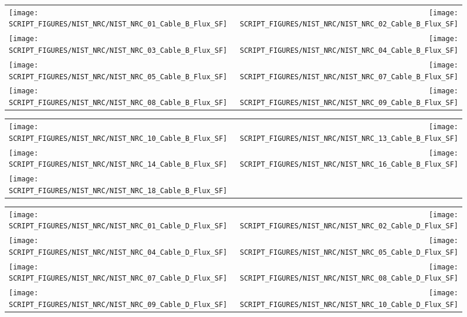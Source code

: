 \clearpage

\begin{figure}[!ht]
\begin{tabular*}{\textwidth}{l@{\extracolsep{\fill}}r}
\texttt{[image: SCRIPT\_FIGURES/NIST\_NRC/NIST\_NRC\_01\_Cable\_B\_Flux\_SF]} &
\texttt{[image: SCRIPT\_FIGURES/NIST\_NRC/NIST\_NRC\_02\_Cable\_B\_Flux\_SF]} \\
\texttt{[image: SCRIPT\_FIGURES/NIST\_NRC/NIST\_NRC\_03\_Cable\_B\_Flux\_SF]} &
\texttt{[image: SCRIPT\_FIGURES/NIST\_NRC/NIST\_NRC\_04\_Cable\_B\_Flux\_SF]} \\
\texttt{[image: SCRIPT\_FIGURES/NIST\_NRC/NIST\_NRC\_05\_Cable\_B\_Flux\_SF]} &
\texttt{[image: SCRIPT\_FIGURES/NIST\_NRC/NIST\_NRC\_07\_Cable\_B\_Flux\_SF]} \\
\texttt{[image: SCRIPT\_FIGURES/NIST\_NRC/NIST\_NRC\_08\_Cable\_B\_Flux\_SF]} &
\texttt{[image: SCRIPT\_FIGURES/NIST\_NRC/NIST\_NRC\_09\_Cable\_B\_Flux\_SF]}
\end{tabular*}
\end{figure}

\begin{figure}[!ht]
\begin{tabular*}{\textwidth}{l@{\extracolsep{\fill}}r}
\texttt{[image: SCRIPT\_FIGURES/NIST\_NRC/NIST\_NRC\_10\_Cable\_B\_Flux\_SF]} &
\texttt{[image: SCRIPT\_FIGURES/NIST\_NRC/NIST\_NRC\_13\_Cable\_B\_Flux\_SF]} \\
\texttt{[image: SCRIPT\_FIGURES/NIST\_NRC/NIST\_NRC\_14\_Cable\_B\_Flux\_SF]} &
\texttt{[image: SCRIPT\_FIGURES/NIST\_NRC/NIST\_NRC\_16\_Cable\_B\_Flux\_SF]} \\
\texttt{[image: SCRIPT\_FIGURES/NIST\_NRC/NIST\_NRC\_18\_Cable\_B\_Flux\_SF]}
\end{tabular*}
\end{figure}

\begin{figure}[!ht]
\begin{tabular*}{\textwidth}{l@{\extracolsep{\fill}}r}
\texttt{[image: SCRIPT\_FIGURES/NIST\_NRC/NIST\_NRC\_01\_Cable\_D\_Flux\_SF]} &
\texttt{[image: SCRIPT\_FIGURES/NIST\_NRC/NIST\_NRC\_02\_Cable\_D\_Flux\_SF]} \\
\texttt{[image: SCRIPT\_FIGURES/NIST\_NRC/NIST\_NRC\_04\_Cable\_D\_Flux\_SF]} &
\texttt{[image: SCRIPT\_FIGURES/NIST\_NRC/NIST\_NRC\_05\_Cable\_D\_Flux\_SF]} \\
\texttt{[image: SCRIPT\_FIGURES/NIST\_NRC/NIST\_NRC\_07\_Cable\_D\_Flux\_SF]} &
\texttt{[image: SCRIPT\_FIGURES/NIST\_NRC/NIST\_NRC\_08\_Cable\_D\_Flux\_SF]} \\
\texttt{[image: SCRIPT\_FIGURES/NIST\_NRC/NIST\_NRC\_09\_Cable\_D\_Flux\_SF]} &
\texttt{[image: SCRIPT\_FIGURES/NIST\_NRC/NIST\_NRC\_10\_Cable\_D\_Flux\_SF]}
\end{tabular*}
\end{figure}

